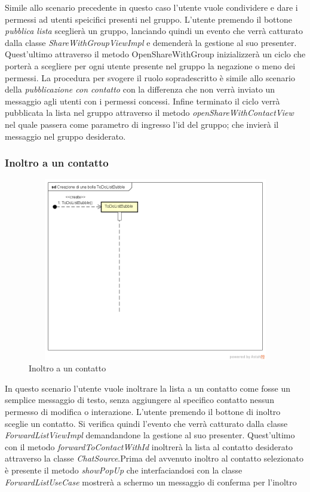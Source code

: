 Simile allo scenario precedente in questo caso l'utente vuole condividere e dare i permessi ad utenti speicifici presenti nel gruppo. L'utente premendo il bottone \textit{pubblica lista} sceglierà un gruppo, lanciando quindi un evento che verrà catturato dalla classe \textit{ShareWithGroupViewImpl}
\newpage e demenderà la gestione al suo presenter. Quest'ultimo attraverso il metodo OpenShareWithGroup inizializzerà un ciclo che porterà a scegliere per ogni utente presente nel gruppo la negazione o meno dei permessi. La procedura per svogere il ruolo sopradescritto è simile allo scenario della \textit{pubblicazione con contatto} con la differenza che non verrà inviato un messaggio agli utenti con i permessi concessi. Infine terminato il ciclo verrà pubblicata la lista nel gruppo attraverso il metodo \textit{openShareWithContactView} nel quale passera come parametro di ingresso l'id del gruppo; che invierà il messaggio nel gruppo desiderato.

\subsubsection{Inoltro a un contatto}

\label{Inoltro a un contatto}
\begin{figure}[ht]
	\centering
	\includegraphics[width=12cm, height=8cm]{Sezioni/Diagrammi/img/Creazione di una bolla ToDoListBubble.png}
	\caption{Inoltro a un contatto}
	
\end{figure}

In questo scenario l'utente vuole inoltrare la lista a un contatto come fosse un semplice messaggio di testo, senza aggiungere al specifico contatto nessun permesso di modifica o interazione. L'utente premendo il bottone di inoltro sceglie un contatto. Si verifica quindi l'evento che verrà catturato dalla classe \textit{ForwardListViewImpl} demandandone la gestione al suo presenter.
Quest'ultimo con il metodo \textit{forwardToContactWithId} inoltrerà la lista al contatto desiderato attraverso la classe \textit{ChatSource}.Prima del avvenuto inoltro al contatto selezionato è presente il metodo \textit{showPopUp} che interfaciandosi con la classe \textit{ForwardListUseCase} mostrerà a schermo un messaggio di conferma per l'inoltro 



